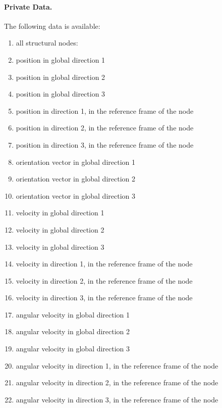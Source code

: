 \paragraph{Private Data.}
\label{sec:NODE:STRUCTURAL:PRIV}
The following data is available:
\begin{enumerate}
\item[] all structural nodes:
\item {} position in global direction 1
\item {} position in global direction 2
\item {} position in global direction 3
\item {} position in direction 1, in the reference frame of the node
\item {} position in direction 2, in the reference frame of the node
\item {} position in direction 3, in the reference frame of the node
\item {} orientation vector in global direction 1
\item {} orientation vector in global direction 2
\item {} orientation vector in global direction 3
\item {} velocity in global direction 1
\item {} velocity in global direction 2
\item {} velocity in global direction 3
\item {} velocity in direction 1, in the reference frame of the node
\item {} velocity in direction 2, in the reference frame of the node
\item {} velocity in direction 3, in the reference frame of the node
\item {} angular velocity in global direction 1
\item {} angular velocity in global direction 2
\item {} angular velocity in global direction 3
\item {} angular velocity in direction 1, in the reference frame of the node
\item {} angular velocity in direction 2, in the reference frame of the node
\item {} angular velocity in direction 3, in the reference frame of the node

\end{enumerate}
